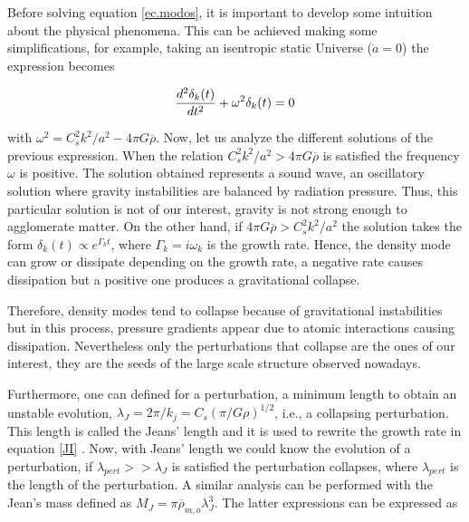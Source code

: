 Before solving equation \ref{ec.modos}, it is important to develop
some intuition about the	 physical phenomena. This can be achieved making some 
simplifications, for example, taking an isentropic static Universe ($\dot{a}=0$)
the expression becomes

\begin{equation}
\frac{d^2\delta_k(t)}{dt^2} + \omega^2\delta_k(t) = 0 \nonumber
\label{JI}
\end{equation} 

with $\omega^2 = C_s^2k^2/a^2-4\pi G\overline{\rho}$. Now, let us analyze
the different solutions of the previous expression. When the relation 
$C_s^2k^2/a^2>4\pi G\overline{\rho}$ is satisfied the frequency $\omega$ is
positive. The solution obtained represents a sound wave, an oscillatory solution where 
gravity instabilities are balanced by radiation pressure. Thus, this 
particular solution is not of our interest, gravity is not strong enough to
agglomerate matter.
On the other hand, if $4\pi G\overline{\rho}>C_s^2k^2/a^2$ the solution takes the form 
$\delta_k(t)\propto e^{\Gamma_k t}$, where $\Gamma_k=i\omega_k$ is the growth rate. 
Hence, the density mode can grow or dissipate depending on the growth rate, a negative 
rate causes dissipation but a positive one produces a gravitational collapse.

Therefore, density modes tend to collapse because of gravitational instabilities but 
in this process, pressure gradients appear due to atomic interactions causing dissipation. 
Nevertheless only the perturbations that collapse are the ones of our interest, they are the 
seeds of the large scale structure observed nowadays.

Furthermore, one can defined for a perturbation, a minimum length to 
obtain an unstable evolution, $\lambda_J = 2\pi/k_j = C_s(\pi/G\rho)^{1/2}$, i.e., 
a collapsing perturbation. This length is called the Jeans' length and 
it is used to rewrite the growth rate in equation \ref{JI} . 
Now, with Jeans' length we could know the evolution of a perturbation,
if $\lambda_{pert}>>\lambda_J$ is satisfied the perturbation collapses, 
where $\lambda_{pert}$ is the length of the perturbation. A similar analysis
can be performed with the Jean's mass defined as $M_J =  \pi\overline{\rho}_{m,o}\lambda_J^3 $.
The latter expressions can be expressed as

